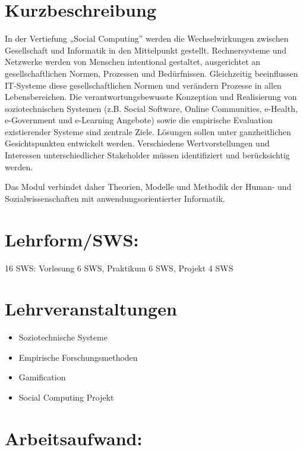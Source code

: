 \section*{Kurzbeschreibung}\label{kurzbeschreibung-7}

In der Vertiefung „Social Computing'' werden die Wechselwirkungen
zwischen Gesellschaft und Informatik in den Mittelpunkt gestellt.
Rechnersysteme und Netzwerke werden von Menschen intentional gestaltet,
ausgerichtet an gesellschaftlichen Normen, Prozessen und Bedürfnissen.
Gleichzeitig beeinflussen IT-Systeme diese gesellschaftlichen Normen und
verändern Prozesse in allen Lebensbereichen. Die verantwortungsbewusste
Konzeption und Realisierung von soziotechnischen Systemen (z.B. Social
Software, Online Communities, e-Health, e-Government und e-Learning
Angebote) sowie die empirische Evaluation existierender Systeme sind
zentrale Ziele. Lösungen sollen unter ganzheitlichen Gesichtspunkten
entwickelt werden. Verschiedene Wertvorstellungen und Interessen
unterschiedlicher Stakeholder müssen identifiziert und berücksichtig
werden.

Das Modul verbindet daher Theorien, Modelle und Methodik der Human- und
Sozialwissenschaften mit anwendungsorientierter Informatik.

\section*{Lehrform/SWS:}\label{lehrformsws-27}

16 SWS: Vorlesung 6 SWS, Praktikum 6 SWS, Projekt 4 SWS

\section*{Lehrveranstaltungen}\label{lehrveranstaltungen-2}

\begin{itemize}
\tightlist
\item
  Soziotechnische Systeme
\item
  Empirische Forschungsmethoden
\item
  Gamification
\item
  Social Computing Projekt
\end{itemize}

\section*{Arbeitsaufwand:}\label{arbeitsaufwand-26}

